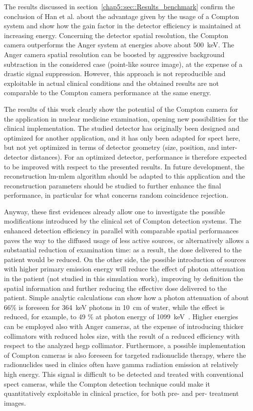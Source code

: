 The results discussed in section~\ref{chap5::sec::Results_benchmark} confirm the conclusion of Han et al. about the advantage given by the usage of a Compton system and show how the gain factor in the detector efficiency is maintained at increasing energy. Concerning the detector spatial resolution, the Compton camera outperforms the Anger system at energies above about 500~keV. The Anger camera spatial resolution can be boosted by aggressive background subtraction in the considered case (point-like source image), at the expense of a drastic signal suppression. However, this approach is not reproducible and exploitable in actual clinical conditions and the obtained results are not comparable to the Compton camera performance at the same energy.

The results of this work clearly show the potential of the Compton camera for the application in nuclear medicine examination, opening new possibilities for the clinical implementation. The studied detector has originally been designed and optimized for another application, and it has only been adapted for \gls{spect} here, but not yet optimized in terms of detector geometry (size, position, and inter-detector distances). For an optimized detector, performance is therefore expected to be improved with respect to the presented results. In future development, the reconstruction \gls{lm-mlem} algorithm should be adapted to this application and the reconstruction parameters should be studied to further enhance the final performance, in particular for what concerns random coincidence rejection.

Anyway, these first evidences already allow one to investigate the possible modifications introduced by the clinical set of Compton detection systems. The enhanced detection efficiency in parallel with comparable spatial performances paves the way to the diffused usage of less active sources, or alternatively allows a substantial reduction of examination time: as a result, the dose delivered to the patient would be reduced. On the other side, the possible introduction of sources with higher primary emission energy will reduce the effect of photon attenuation in the patient (not studied in this simulation work), improving by definition the spatial information and further reducing the effective dose delivered to the patient. Simple analytic calculations can show how a photon attenuation of about 66\% is foreseen for 364~keV photons in 10~cm of water, while the effect is reduced, for example, to 49 \% at photon energy of 1099~keV~\parencite{Hubbell1987}. Higher energies can be employed also with Anger cameras, at the expense of introducing thicker collimators with reduced holes size, with the result of a reduced efficiency with respect to the analyzed \gls{hegp} collimator.
Furthermore, a possible implementation of Compton cameras is also foreseen for targeted radionuclide therapy, where the radionuclides used in clinics often have gamma radiation emission at relatively high energy. This signal is difficult to be detected and treated with conventional \gls{spect} cameras, while the Compton detection technique could make it quantitatively exploitable in clinical practice, for both pre- and per- treatment images.
   
